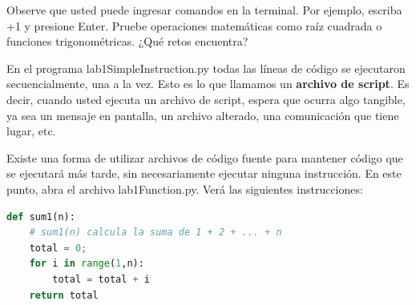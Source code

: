 Observe que usted puede ingresar comandos en la terminal. Por ejemplo, escriba {+1} y presione Enter. Pruebe operaciones matemáticas como raíz cuadrada o funciones trigonométricas. ¿Qué retos encuentra? \QA

En el programa {\s lab1SimpleInstruction.py} todas las líneas de código se ejecutaron secuencialmente, una a la vez. Esto es lo que llamamos un \textbf{archivo de script}. Es decir, cuando usted ejecuta un archivo de script, espera que ocurra algo tangible, ya sea un mensaje en pantalla, un archivo alterado, una comunicación que tiene lugar, etc.

Existe una forma de utilizar archivos de código fuente para mantener código que se ejecutará más tarde, sin necesariamente ejecutar ninguna instrucción. En este punto, abra el archivo {\s lab1Function.py}. Verá las siguientes instrucciones:

\begin{lstlisting}[language=Python]
def sum1(n):
    # sum1(n) calcula la suma de 1 + 2 + ... + n
    total = 0;
    for i in range(1,n):
        total = total + i
    return total
\end{lstlisting}

